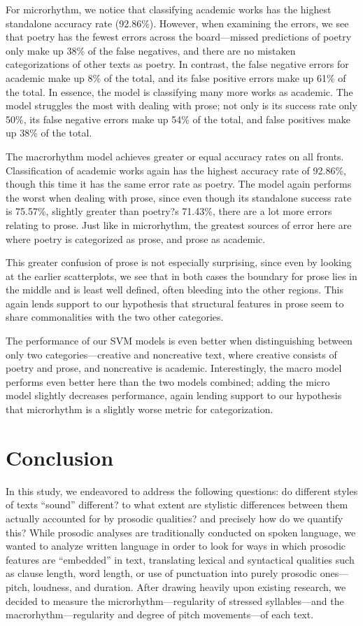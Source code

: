 \documentclass[pageno]{jpaper}
\newcommand{\quotes}[1]{``#1''}
\begin{document}
For microrhythm, we notice that classifying academic works has the highest standalone accuracy rate (92.86\%). However, when examining the errors, we see that poetry has the fewest errors across the board---missed predictions of poetry only make up 38\% of the false negatives, and there are no mistaken categorizations of other texts as poetry. In contrast, the false negative errors for academic make up 8\% of the total, and its false positive errors make up 61\% of the total. In essence, the model is classifying many more works as academic. The model struggles the most with dealing with prose; not only is its success rate only 50\%, its false negative errors make up 54\% of the total, and false positives make up 38\% of the total. 

The macrorhythm model achieves greater or equal accuracy rates on all fronts. Classification of academic works again has the highest accuracy rate of 92.86\%, though this time it has the same error rate as poetry. The model again performs the worst when dealing with prose, since even though its standalone success rate is 75.57\%, slightly greater than poetry?s 71.43\%, there are a lot more errors relating to prose. Just like in microrhythm, the greatest sources of error here are where poetry is categorized as prose, and prose as academic. 

This greater confusion of prose is not especially surprising, since even by looking at the earlier scatterplots, we see that in both cases the boundary for prose lies in the middle and is least well defined, often bleeding into the other regions. This again lends support to our hypothesis that structural features in prose seem to share commonalities with the two other categories.

The performance of our SVM models is even better when distinguishing between only two categories---creative and noncreative text, where creative consists of poetry and prose, and noncreative is academic. Interestingly, the macro model performs even better here than the two models combined; adding the micro model slightly decreases performance, again lending support to our hypothesis that microrhythm is a slightly worse metric for categorization. 



\section{Conclusion}
In this study, we endeavored to address the following questions: do different styles of texts \quotes{sound} different? to what extent are stylistic differences between them actually accounted for by prosodic qualities? and precisely how do we quantify this? While prosodic analyses are traditionally conducted on spoken language, we wanted to analyze written language in order to look for ways in which prosodic features are \quotes{embedded} in text, translating lexical and syntactical qualities such as clause length, word length, or use of punctuation into purely prosodic ones---pitch, loudness, and duration. After drawing heavily upon existing research, we decided to measure the microrhythm---regularity of stressed syllables---and the macrorhythm---regularity and degree of pitch movements---of each text. 
\end{document}
